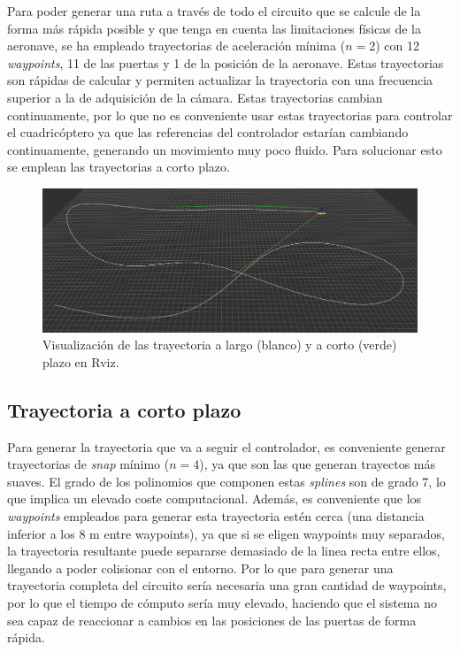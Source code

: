Para poder generar una ruta a través de todo el circuito que se calcule de la forma más rápida posible y que tenga en cuenta las limitaciones físicas de la aeronave, se ha empleado trayectorias de aceleración mínima ($n = 2$) con 12 \textit{waypoints}, 11 de las puertas y 1 de la posición de la aeronave. Estas trayectorias son rápidas de calcular y permiten actualizar la trayectoria con una frecuencia superior a la de adquisición de la cámara. Estas trayectorias cambian continuamente, por lo que no es conveniente usar estas trayectorias para controlar el cuadricóptero ya que las referencias del controlador estarían cambiando continuamente, generando un movimiento muy poco fluido. Para solucionar esto se emplean las trayectorias a corto plazo.

\begin{figure}[htb!]
	\centering
	\includegraphics[width=1\textwidth]{imagenes/Rviz_traj_largo}
	\caption{Visualización de las trayectoria a largo (blanco) y a corto (verde) plazo en Rviz.}
	\label{rviz:traj_largo}
\end{figure}
\newpage

\subsection{Trayectoria a corto plazo}

Para generar la trayectoria que va a seguir el controlador, es conveniente generar trayectorias de \textit{snap} mínimo ($n=4$), ya que son las que generan trayectos más suaves. El grado de los polinomios que componen estas \textit{splines} son de grado 7, lo que implica un elevado coste computacional. Además, es conveniente que los \textit{waypoints} empleados para generar esta trayectoria estén cerca (una distancia inferior a los 8 m entre waypoints), ya que si se eligen waypoints muy separados, la trayectoria resultante puede separarse demasiado de la linea recta entre ellos, llegando a poder colisionar con el entorno. Por lo que para generar una trayectoria completa del circuito sería necesaria una gran cantidad de waypoints, por lo que el tiempo de cómputo sería muy elevado, haciendo que el sistema no sea capaz de reaccionar a cambios en las posiciones de las puertas de forma rápida.

